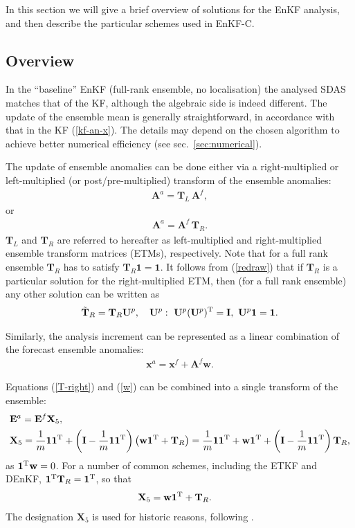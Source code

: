 \documentclass[11pt]{report}
\newcommand{\mb} {\mathbf}
\newcommand{\T}{^{\tiny \mathrm T}}
\begin{document}
In this section we will give a brief overview of solutions for the EnKF analysis, and then describe the particular schemes used in EnKF-C.

\subsection{Overview}

In the ``baseline'' EnKF (full-rank ensemble, no localisation) the analysed SDAS matches that of the KF, although the algebraic side is indeed different.
The update of the ensemble mean is generally straightforward, in accordance with that in the KF (\ref{kf-an-x}).
The details may depend on the chosen algorithm to achieve better numerical efficiency (see sec.~\ref{sec:numerical}).

The update of ensemble anomalies can be done either via a right-multiplied or left-multiplied (or post/pre-multiplied) transform of the ensemble anomalies:
\begin{align}
  \label{T-left}
  \mb A^a = \mb T_L \,\mb A^f,
\end{align}
or
\begin{align}
  \label{T-right}
  \mb A^a = \mb A^f \, \mb T_R.
\end{align}
$\mb T_L$ and $\mb T_R$ are referred to hereafter as left-multiplied and right-multiplied ensemble transform matrices (ETMs), respectively.
Note that for a full rank ensemble $\mb T_R$ has to satisfy $\mb T_R \mb 1 = \mb 1$.
It follows from (\ref{redraw}) that if $\mb T_R$ is a particular solution for the right-multiplied ETM, then (for a full rank ensemble) any other solution can be written as
\begin{align}
  \label{TR-all}
  \tilde{\mb T}_R = \mb T_R \mb U^p, \quad \mb U^p:\ \mb U^p (\mb U^p)\T = \mb I,\ \mb U^p \mb 1 = \mb 1.
\end{align}

Similarly, the analysis increment can be represented as a linear combination of the forecast ensemble anomalies:
\begin{align}
  \label{w}
  \mb x^a = \mb x^f + \mb A^f \mb w.
\end{align}

Equations (\ref{T-right}) and (\ref{w}) can be combined into a single transform of the ensemble:
\begin{align}
  \label{x5-def}
  & \mb E^a = \mb E^f \mb X_5,\\
  & \mb X_5 = \frac{1}{m} \mb 1 \mb 1\T + \left( \mb I - \frac{1}{m} \mb 1 \mb 1\T\right) \left( \mb w \mb 1\T + \mb T_R\right)
  = \frac{1}{m} \mb 1 \mb 1\T + \mb w \mb 1\T + \left( \mb I - \frac{1}{m} \mb 1 \mb 1\T \right) \mb T_R,
\end{align}
as $\mb 1\T \mb w = 0$. 
For a number of common schemes, including the ETKF and DEnKF, $\mb 1\T \mb T_R = \mb 1\T$, so that
\begin{align}
  \label{x5}
  & \mb X_5 = \mb w \mb 1\T + \mb T_R.
\end{align}
The designation $\mb X_5$ is used for historic reasons, following \citet{eve03a}.
\end{document}
